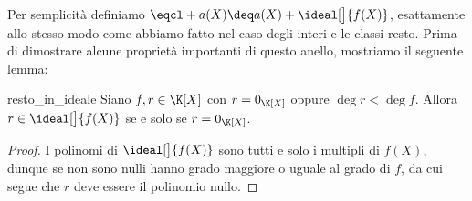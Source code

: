 Per semplicità definiamo $\eqcl+{a(X)} \deq a(X) + \ideal[\big]{f(X)}$, esattamente allo stesso modo come abbiamo fatto nel caso degli interi e le classi resto.
Prima di dimostrare alcune proprietà importanti di questo anello, mostriamo il seguente lemma:
\begin{lemma}{resto_in_ideale}
    Siano $f, r \in \K[X]$ con $r = 0_{\K[X]}$ oppure $\deg r < \deg f$. Allora $r \in \ideal[\big]{f(X)}$ se e solo se $r = 0_{\K[X]}$.
\end{lemma}
\begin{proof}
    I polinomi di $\ideal[\big]{f(X)}$ sono tutti e solo i multipli di $f(X)$, dunque se non sono nulli hanno grado maggiore o uguale al grado di $f$, da cui segue che $r$ deve essere il polinomio nullo.
\end{proof}

